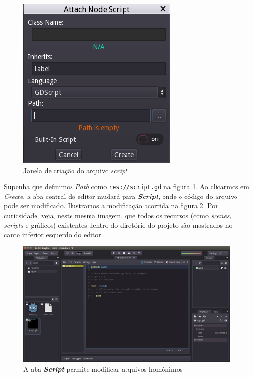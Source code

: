\begin{figure}[H]
\begin{minipage}{.5\textwidth}
    \includegraphics[width=.75\textwidth]{image/editor-script-window}
    \caption{Janela de criação do arquivo \textit{script}}
    \label{editor-script-window}
  \end{minipage}
\end{figure}

Suponha que definimos \textit{Path} como \texttt{res://script.gd} na figura \ref{editor-script-window}. Ao clicarmos em \textit{Create}, a aba central do editor mudará para \textbf{\textit{Script}}, onde o código do arquivo pode ser modificado. Ilustramos a modificação ocorrida na figura \ref{editor-script-write}. Por curiosidade, veja, neste mesma imagem, que todos os recursos (como \textit{scenes}, \textit{scripts} e gráficos) existentes dentro do diretório do projeto são mostrados no canto inferior esquerdo do editor.

\begin{figure}[H]
  \centering
  \includegraphics[width=.9\textwidth]{image/editor-script-write}
  \caption{A aba \textbf{\textit{Script}} permite modificar arquivos homônimos}
  \label{editor-script-write}
\end{figure}

